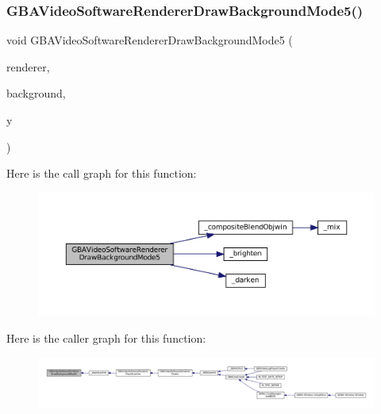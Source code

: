 \subsubsection{\texorpdfstring{G\+B\+A\+Video\+Software\+Renderer\+Draw\+Background\+Mode5()}{GBAVideoSoftwareRendererDrawBackgroundMode5()}}
{\footnotesize\ttfamily void G\+B\+A\+Video\+Software\+Renderer\+Draw\+Background\+Mode5 (\begin{DoxyParamCaption}\item[{struct G\+B\+A\+Video\+Software\+Renderer $\ast$}]{renderer,  }\item[{struct G\+B\+A\+Video\+Software\+Background $\ast$}]{background,  }\item[{\mbox{\hyperlink{ioapi_8h_a787fa3cf048117ba7123753c1e74fcd6}{int}}}]{y }\end{DoxyParamCaption})}

Here is the call graph for this function\+:
\nopagebreak
\begin{figure}[H]
\begin{center}
\leavevmode
\includegraphics[width=350pt]{software-private_8h_aa15bd912d55150946d944ab1ea4d457f_cgraph}
\end{center}
\end{figure}
Here is the caller graph for this function\+:
\nopagebreak
\begin{figure}[H]
\begin{center}
\leavevmode
\includegraphics[width=350pt]{software-private_8h_aa15bd912d55150946d944ab1ea4d457f_icgraph}
\end{center}
\end{figure}
\mbox{\label{software-private_8h_a47b212d8fd0ffc36105a78d71946516b}} 

